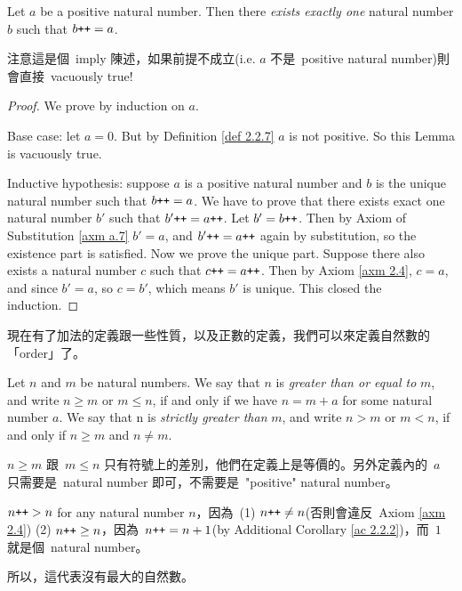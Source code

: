 \begin{lemma}\label{lem 2.2.10}
Let \(a\) be a positive natural number. Then there \emph{exists exactly one} natural number \(b\) such that \(b\texttt{++} = a\).
\end{lemma}
\begin{note}
注意這是個\ imply 陳述，如果前提不成立(i.e. \(a\) 不是\ positive natural number)則會直接\ vacuously true!
\end{note}
\begin{proof}
We prove by induction on \(a\).

Base case: let \(a = 0\). But by Definition \ref{def 2.2.7} \(a\) is not positive. So this Lemma is vacuously true.

Inductive hypothesis: suppose \(a\) is a positive natural number and \(b\) is the unique natural number such that \(b\texttt{++} = a\). We have to prove that there exists exact one natural number \(b'\) such that \(b'\texttt{++} = a\texttt{++}\). Let \(b' = b\texttt{++}\). Then by Axiom of Substitution \ref{axm a.7} \(b' = a\), and \(b'\texttt{++} = a\texttt{++}\) again by substitution, so the existence part is satisfied. Now we prove the unique part. Suppose there also exists a natural number \(c\) such that \(c\texttt{++} = a\texttt{++}\). Then by Axiom \ref{axm 2.4}, \(c = a\), and since \(b' = a\), so \(c = b'\), which means \(b'\) is unique. This closed the induction.
\end{proof}

\begin{note}
現在有了加法的定義跟一些性質，以及正數的定義，我們可以來定義自然數的「order」了。
\end{note}

\begin{definition} \label{def 2.2.11} Let \(n\) and \(m\) be natural numbers. We say that \(n\) is \emph{greater than or equal to} \(m\), and write \(n \geq m\) or \(m \leq n\), if and only if we have \(n = m + a\) for some natural number \(a\). We say that n is \emph{strictly greater than} \(m\), and write \(n > m\) or \(m < n\), if and only if \(n \geq m\) and \(n \neq m\).
\end{definition}
\begin{note}
\(n \geq m\) 跟\ \(m \leq n\) 只有符號上的差別，他們在定義上是等價的。另外定義內的\ \(a\) 只需要是\ natural number 即可，不需要是\ "positive" natural number。
\end{note}
\begin{note}
\(n\texttt{++} > n\) for any natural number \(n\)，因為\ (1) \(n\texttt{++} \neq n\)(否則會違反\ Axiom \ref{axm 2.4}) (2) \(n\texttt{++} \geq n\)，因為\ \(n\texttt{++} = n + 1\)(by Additional Corollary \ref{ac 2.2.2})，而\ \(1\) 就是個\ natural number。

所以，這代表沒有最大的自然數。
\end{note}

